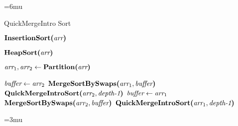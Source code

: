 \begin{algorithm}[]
	\unboldmath
	\thinmuskip=6mu
	\caption{QuickMergeIntro Sort}
	\begin{algorithmic}[1]
		
		\State
		  \label{line:qmi-insertion-sort}
		\State $\textbf{InsertionSort(}\textit{arr}\textbf{)}$
		
		\State
		  \label{line:qmi-heap-sort}
		\State $\textbf{HeapSort(}\textit{arr}\textbf{)}$
		
		\State
		\Else \label{line:quick-merge-intro-sort}
		\State $\textit{arr}_1, \textit{arr}_2 \gets \textbf{Partition(}\textit{arr}\textbf{)}$ 
		
		\State
		 
		\State $\textit{buffer} \gets \textit{arr}_2$
		\State $\textbf{MergeSortBySwaps(}\textit{arr}_1, \textit{buffer}\textbf{)}$
		\State $\textbf{QuickMergeIntroSort(}\textit{arr}_2, \textit{depth-1}\textbf{)}$
		\Else
		\State $\textit{buffer} \gets \textit{arr}_1$
		\State $\textbf{MergeSortBySwaps(}\textit{arr}_2, \textit{buffer}\textbf{)}$
		\State $\textbf{QuickMergeIntroSort(}\textit{arr}_1, \textit{depth-1}\textbf{)}$
		\EndIf
		\EndIf
		
		\State
		\EndProcedure
	\end{algorithmic}
	\boldmath
	\thinmuskip=3mu
	\label{pseudocode:quick-merge-intro-sort}
\end{algorithm}
